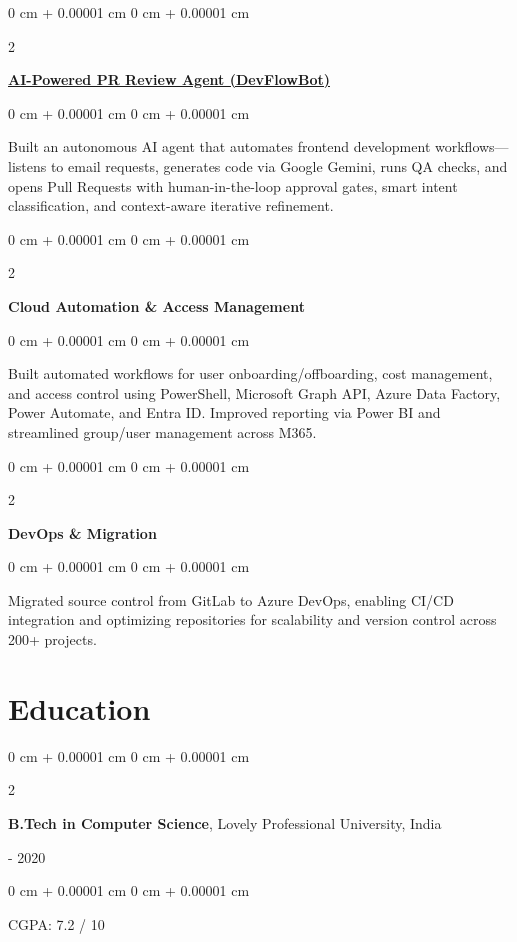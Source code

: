 \documentclass[10pt, letterpaper]{article}
\newenvironment{onecolentry}{
    \begin{adjustwidth}{
        0 cm + 0.00001 cm
    }{
        0 cm + 0.00001 cm
    }
}{
    \end{adjustwidth}
}
\newenvironment{twocolentry}[2][]{
    \onecolentry
    \def\secondColumn{#2}
    \setcolumnwidth{\fill, 4.5 cm}
    \begin{paracol}{2}
}{
    \switchcolumn \raggedleft \secondColumn
    \end{paracol}
    \endonecolentry
}
\begin{document}
\vspace{0.2 cm}

\begin{twocolentry}{2025}
    \textbf{\href{https://github.com/chinmay-dhok/DevFlowBot-Gemini-3-Pro-GitHubPR}{AI-Powered PR Review Agent (DevFlowBot)}}
\end{twocolentry}
\vspace{0.10 cm}
\begin{onecolentry}
    Built an autonomous AI agent that automates frontend development workflows---listens to email requests, generates code via Google Gemini, runs QA checks, and opens Pull Requests with human-in-the-loop approval gates, smart intent classification, and context-aware iterative refinement.
\end{onecolentry}

\vspace{0.2 cm}

\begin{twocolentry}{}
    \textbf{Cloud Automation \& Access Management}
\end{twocolentry}
\vspace{0.10 cm}
\begin{onecolentry}
    Built automated workflows for user onboarding/offboarding, cost management, and access control using PowerShell, Microsoft Graph API, Azure Data Factory, Power Automate, and Entra ID. Improved reporting via Power BI and streamlined group/user management across M365.
\end{onecolentry}

\vspace{0.2 cm}

\begin{twocolentry}{}
    \textbf{DevOps \& Migration}
\end{twocolentry}
\vspace{0.10 cm}
\begin{onecolentry}
    Migrated source control from GitLab to Azure DevOps, enabling CI/CD integration and optimizing repositories for scalability and version control across 200+ projects.
\end{onecolentry}


\section{Education}

\vspace{0.2 cm}

\begin{twocolentry}{2016 - 2020}
    \textbf{B.Tech in Computer Science}, Lovely Professional University, India
\end{twocolentry}
\vspace{0.05 cm}
\begin{onecolentry}
    CGPA: 7.2 / 10
\end{onecolentry}
\end{document}
